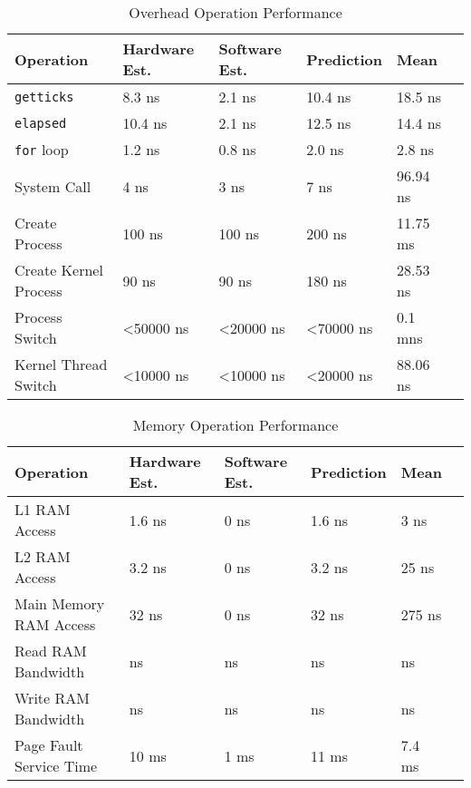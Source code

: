 \documentclass{article} %
\begin{document}
\begin{table}[!htbp]
  \caption{Overhead Operation Performance}
  \begin{tabular}{|l|l|l|l|l|l|}
    \hline
    Operation              & Hardware Est.         & Software Est.         & Prediction            & Mean     \\ \hline
    \texttt{getticks}      & 8.3 ns                & 2.1 ns                & 10.4 ns               & 18.5 ns\\ \hline
    \texttt{elapsed}       & 10.4 ns               & 2.1 ns                & 12.5 ns               & 14.4 ns\\ \hline
    \texttt{for} loop      & 1.2 ns                & 0.8 ns                & 2.0 ns                & 2.8 ns\\ \hline
    System Call            & 4 ns                  & 3 ns                  & 7 ns                  & 96.94 ns\\ \hline
    Create Process         & 100 ns                & 100 ns                & 200 ns                & 11.75 ms\\ \hline
    Create Kernel Process  & 90 ns                 & 90 ns                 & 180 ns                & 28.53 ns\\ \hline
    Process Switch         & \textless50000 ns     & \textless20000 ns     & \textless70000 ns     & 0.1 mns\\ \hline
    Kernel Thread Switch   & \textless10000 ns     & \textless10000 ns     & \textless20000 ns     & 88.06 ns\\ \hline
  \end{tabular}
\label{table:overview_overhead}
\end{table}

\begin{table}[!htbp]
  \caption{Memory Operation Performance}
  \begin{tabular}{|l|l|l|l|l|l|}
    \hline
    Operation               & Hardware Est.         & Software Est.         & Prediction            & Mean     \\ \hline
    L1 RAM Access           & 1.6 ns                & 0 ns                  & 1.6 ns                & 3 ns\\ \hline
    L2 RAM Access           & 3.2 ns                & 0 ns                  & 3.2 ns                & 25 ns\\ \hline
    Main Memory RAM Access  & 32 ns                 & 0 ns                  & 32 ns                 & 275 ns\\ \hline
    Read RAM Bandwidth      & ns                    & ns                    & ns                    & ns\\ \hline
    Write RAM Bandwidth     & ns                    & ns                    & ns                    & ns\\ \hline
    Page Fault Service Time & 10 ms                 & 1 ms                  & 11 ms                 & 7.4 ms\\ \hline
  \end{tabular}
\label{table:overview_memory}
\end{table}
\end{document}

